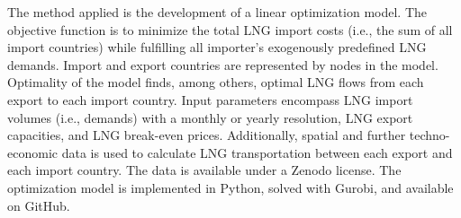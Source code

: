 The method applied is the development of a linear optimization model. The objective function is to minimize the total LNG import costs (i.e., the sum of all import countries) while fulfilling all importer's exogenously predefined LNG demands. Import and export countries are represented by nodes in the model. Optimality of the model finds, among others, optimal LNG flows from each export to each import country. Input parameters encompass LNG import volumes (i.e., demands) with a monthly or yearly resolution, LNG export capacities, and LNG break-even prices. Additionally, spatial and further techno-economic data is used to calculate LNG transportation between each export and each import country. The data is available under a Zenodo license. The optimization model is implemented in Python, solved with Gurobi, and available on GitHub. 
